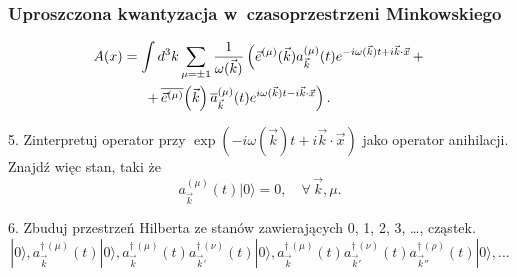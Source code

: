 \documentclass[10pt,t]{beamer}
\begin{document}
\begin{frame}
  \frametitle{Uproszczona kwantyzacja w~czasoprzestrzeni Minkowskiego}


  \begin{equation}
    \label{eq:Czemu-rozwazanie-05}
    \begin{split}
      A( x )
      &=
        \int d^{ 3 }k \sum_{ \mu = \pm 1 } \frac{ 1 }{ \omega( \vec{ k } ) }
        \left( \vec{ e }^{ ( \mu ) }( \vec{ k } ) a_{ \vec{ k } }^{ ( \mu ) }( t )
        e^{ -i \omega( \vec{ k } ) t + i \vec{ k } \cdot \vec{ x } } \, + \right. \\
      &\hspace{1.5em}
        \left. + \, \overline{ \vec{ e }^{ ( \mu ) } }\!\left( \vec{ k } \right)
        \overline{ a }_{ \vec{ k } }^{ ( \mu ) }( t )
        e^{ i \omega( \vec{ k } ) t - i \vec{ k } \cdot \vec{ x } } \right).
    \end{split}
  \end{equation}

  \vspace{-1.5em}



  5. Zinterpretuj operator przy
  $\exp( -i \omega( \vec{ k } ) t + i \vec{ k } \cdot \vec{ x } )$
  jako operator anihilacji. Znajdź więc stan, taki że
  \begin{equation}
    \label{eq:Czemu-rozwazanie-06}
    a_{ \vec{ k } }^{ ( \mu ) }( t ) | 0 \rangle = 0, \quad
    \forall \, \vec{ k }, \mu.
  \end{equation}

  \vspace{-1em}



  6. Zbuduj przestrzeń Hilberta ze stanów zawierających 0, 1, 2, 3, \ldots,
  cząstek.
  \begin{equation}
    \label{eq:Czemu-rozwazanie-07}
    | 0 \rangle, a^{ \dagger \, ( \mu ) }_{ \vec{ k } }( t ) | 0 \rangle,
    a^{ \dagger \, ( \mu ) }_{ \vec{ k } }( t ) a^{ \dagger \, ( \nu ) }_{ \vec{ k }' }( t )
    | 0 \rangle,
    a^{ \dagger \, ( \mu ) }_{ \vec{ k } }( t ) a^{ \dagger \, ( \nu ) }_{ \vec{ k }' }( t )
    a^{ \dagger \, ( \rho ) }_{ \vec{ k }'' }( t ) | 0 \rangle, \ldots
  \end{equation}

\end{frame}
\end{document}
